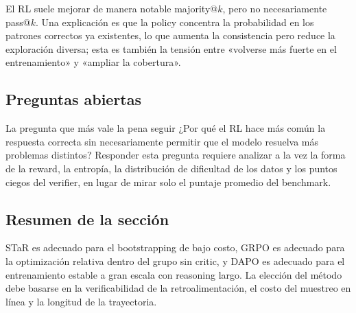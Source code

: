 El RL suele mejorar de manera notable majority@$k$, pero no necesariamente pass@$k$. Una explicación es que la policy concentra la probabilidad en los patrones correctos ya existentes, lo que aumenta la consistencia pero reduce la exploración diversa; esta es también la tensión entre «volverse más fuerte en el entrenamiento» y «ampliar la cobertura».

\subsection{Preguntas abiertas}


\begin{importantbox}{La pregunta que más vale la pena seguir}
¿Por qué el RL hace más común la respuesta correcta sin necesariamente permitir que el modelo resuelva más problemas distintos? Responder esta pregunta requiere analizar a la vez la forma de la reward, la entropía, la distribución de dificultad de los datos y los puntos ciegos del verifier, en lugar de mirar solo el puntaje promedio del benchmark.
\end{importantbox}

\subsection{Resumen de la sección}

STaR es adecuado para el bootstrapping de bajo costo, GRPO es adecuado para la optimización relativa dentro del grupo sin critic, y DAPO es adecuado para el entrenamiento estable a gran escala con reasoning largo. La elección del método debe basarse en la verificabilidad de la retroalimentación, el costo del muestreo en línea y la longitud de la trayectoria.
